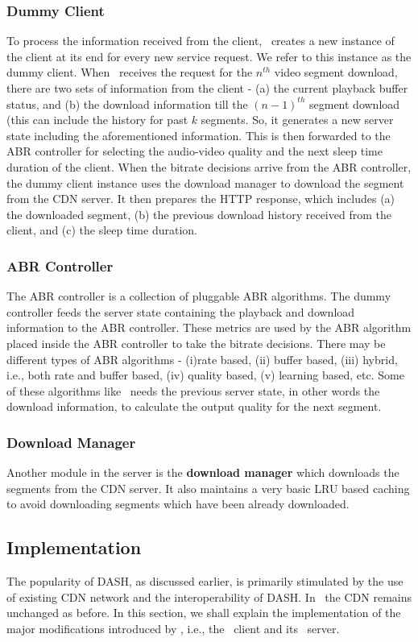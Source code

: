 \subsubsection{Dummy Client}
To process the information received from the client, \servname\  creates a new instance of the client  at its end for every new service request. We refer to this instance as the dummy client. When \servname\ receives the request for the $n^{th}$ video segment download, there are two sets of information from the client - (a)  the current playback buffer status, and (b) the download information till the $(n-1)^{th}$ segment download (this can include the history for past $k$ segments. So, it generates a new server state including the aforementioned information. This is then forwarded to the \ac{ABR} controller for selecting the audio-video quality and the next sleep time duration of the client. When the bitrate decisions arrive from the \ac{ABR} controller, the dummy client instance uses the download manager to download the segment from the \ac{CDN} server. It then prepares the HTTP response, which includes (a) the downloaded segment, (b) the previous download history received from the client, and (c) the sleep time duration.
\subsubsection{ABR Controller}  The ABR controller is a collection of pluggable ABR algorithms. The dummy controller feeds the server state containing the playback and download information to the ABR controller. These metrics are used by the \ac{ABR} algorithm placed inside the ABR controller to take the bitrate decisions. There may be different types of ABR algorithms - (i)rate based, (ii) buffer based, (iii) hybrid, i.e., both rate and buffer based, (iv) quality based, (v) learning based, etc. Some of these algorithms like~\cite{mao2017neural,Akhtar2018,Sengupta2018} needs the previous server state, in other words the download information, to calculate the output quality for the next segment.
\subsubsection{Download Manager}
Another module in the server is the \textbf{download manager} which downloads the segments from the CDN server. It also maintains a very basic LRU based caching to avoid downloading segments which have been already downloaded.
\subsection{Implementation}
The popularity of DASH, as discussed earlier, is primarily stimulated by the use of existing \ac{CDN} network and the interoperability of \ac{DASH}. In \bel\ the \ac{CDN} remains unchanged as before. In this section, we shall explain the implementation of the major modifications introduced by \bel, i.e., the \bel\ client and its \servname\ server.

